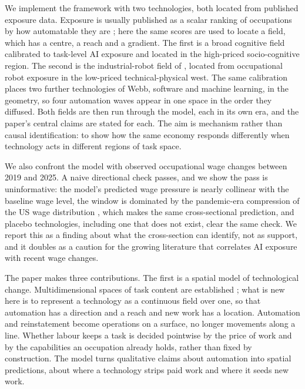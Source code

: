 \documentclass[12pt, a4paper]{article}
\begin{document}
We implement the framework with two technologies, both located from
published exposure data. Exposure is usually published as a scalar
ranking of occupations by how automatable they are
\parencite{frey2017, felten2021occupational}; here the same scores are
used to locate a field, which has a centre, a reach and a gradient. The
first is a broad cognitive field calibrated
to task-level AI exposure and located in the high-priced socio-cognitive
region. The second is the industrial-robot field of \textcite{webb2020},
located from occupational robot exposure in the low-priced technical-physical
west. The same calibration places two further technologies of Webb,
software and machine learning, in the geometry, so four automation waves
appear in one space in the order they diffused. Both fields are then run
through the model, each in its own era, and the paper's central claims
are stated for each. The aim is mechanism rather than causal
identification: to show how the same economy responds differently when
technology acts in different regions of task space.

We also confront the model with observed occupational wage changes
between 2019 and 2025. A naive directional check passes, and we show
the pass is uninformative: the model's predicted wage pressure is
nearly collinear with the baseline wage level, the window is dominated
by the pandemic-era compression of the US wage distribution
\parencite{autor2023compression}, which makes the same cross-sectional
prediction, and placebo technologies, including one that does not
exist, clear the same check. We report this as a finding about what the
cross-section can identify, not as support, and it doubles as a caution
for the growing literature that correlates AI exposure with recent wage
changes.

The paper makes three contributions. The first is a spatial model of
technological change. Multidimensional spaces of task content are
established \parencite{gathmann2010, yamaguchi2012, lindenlaub2017};
what is new here is to represent a technology as a continuous field over
one, so that automation has a direction and a reach and new work has a
location. Automation and reinstatement become operations
on a surface, no longer movements along a line. Whether labour keeps a
task is decided pointwise by the price of work and by the capabilities
an occupation already holds, rather than fixed by construction. The
model turns qualitative claims about automation into spatial
predictions, about where a technology strips paid work and where it
seeds new work.
\end{document}
